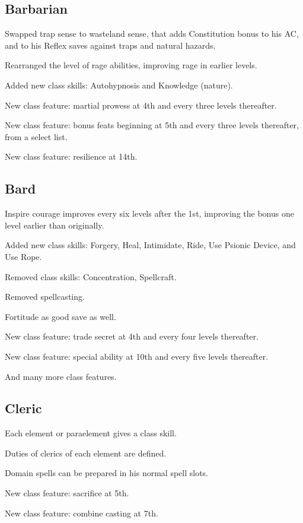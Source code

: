 \subsection{Barbarian}
\begin{itemize*}
\item Swapped trap sense to wasteland sense, that adds Constitution bonus to his AC, and to his Reflex saves against traps and natural hazards.
\item Rearranged the level of rage abilities, improving rage in earlier levels.
\item Added new class skills: Autohypnosis and Knowledge (nature).
\item New class feature: martial prowess at 4th and every three levels thereafter.
\item New class feature: bonus feats beginning at 5th and every three levels thereafter, from a select list.
\item New class feature: resilience at 14th.
\end{itemize*}

\subsection{Bard}
\begin{itemize*}
\item Inspire courage improves every six levels after the 1st, improving the bonus one level earlier than originally.
\item Added new class skills: Forgery, Heal, Intimidate, Ride, Use Psionic Device, and Use Rope.
\item Removed class skills: Concentration, Spellcraft.
\item Removed spellcasting.
\item Fortitude as good save as well.
\item New class feature: trade secret at 4th and every four levels thereafter.
\item New class feature: special ability at 10th and every five levels thereafter.
\item And many more class features.
\end{itemize*}

\subsection{Cleric}
\begin{itemize*}
\item Each element or paraelement gives a class skill.
\item Duties of clerics of each element are defined.
\item Domain spells can be prepared in his normal spell slots.
\item New class feature: sacrifice at 5th.
\item New class feature: combine casting at 7th.
\end{itemize*}

